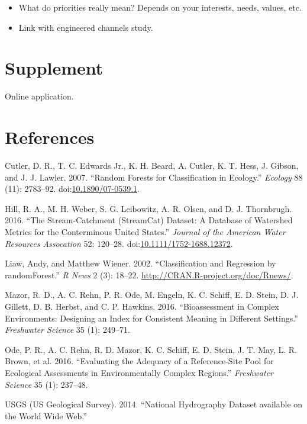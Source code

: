 \documentclass[]{article}
\begin{document}
\begin{itemize}
\item
  What do priorities really mean? Depends on your interests, needs,
  values, etc.
\item
  Link with engineered channels study.
\end{itemize}

\section{Supplement}\label{supplement}

Online application.

\section*{References}\label{references}

\hypertarget{refs}{}
\hypertarget{ref-Cutler07}{}
Cutler, D. R., T. C. Edwards Jr., K. H. Beard, A. Cutler, K. T. Hess, J.
Gibson, and J. J. Lawler. 2007. ``Random Forests for Classification in
Ecology.'' \emph{Ecology} 88 (11): 2783--92.
doi:\href{https://doi.org/10.1890/07-0539.1}{10.1890/07-0539.1}.

\hypertarget{ref-Hill16}{}
Hill, R. A., M. H. Weber, S. G. Leibowitz, A. R. Olsen, and D. J.
Thornbrugh. 2016. ``The Stream-Catchment (StreamCat) Dataset: A Database
of Watershed Metrics for the Conterminous United States.'' \emph{Journal
of the American Water Resources Assocation} 52: 120--28.
doi:\href{https://doi.org/10.1111/1752-1688.12372}{10.1111/1752-1688.12372}.

\hypertarget{ref-Liaw02}{}
Liaw, Andy, and Matthew Wiener. 2002. ``Classification and Regression by
randomForest.'' \emph{R News} 2 (3): 18--22.
\url{http://CRAN.R-project.org/doc/Rnews/}.

\hypertarget{ref-Mazor16}{}
Mazor, R. D., A. C. Rehn, P. R. Ode, M. Engeln, K. C. Schiff, E. D.
Stein, D. J. Gillett, D. B. Herbst, and C. P. Hawkins. 2016.
``Bioassessment in Complex Environments: Designing an Index for
Consistent Meaning in Different Settings.'' \emph{Freshwater Science} 35
(1): 249--71.

\hypertarget{ref-Ode16}{}
Ode, P. R., A. C. Rehn, R. D. Mazor, K. C. Schiff, E. D. Stein, J. T.
May, L. R. Brown, et al. 2016. ``Evaluating the Adequacy of a
Reference-Site Pool for Ecological Assessments in Environmentally
Complex Regions.'' \emph{Freshwater Science} 35 (1): 237--48.

\hypertarget{ref-USGS14}{}
USGS (US Geological Survey). 2014. ``National Hydrography Dataset
available on the World Wide Web.''
\end{document}
